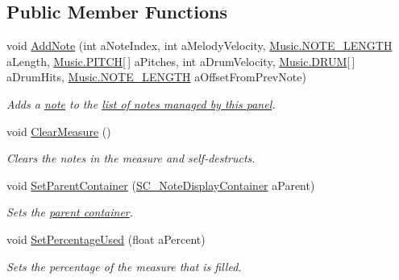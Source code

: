 \subsection*{Public Member Functions}
\begin{DoxyCompactItemize}
\item 
void \hyperlink{group___s_c___m_d_p_pub_func_gadce2fd2e70d867b38c98305e2392b3df}{Add\+Note} (int a\+Note\+Index, int a\+Melody\+Velocity, \hyperlink{group___music_enums_gaf11b5f079adbb21c800b9eca1c5c3cbd}{Music.\+N\+O\+T\+E\+\_\+\+L\+E\+N\+G\+TH} a\+Length, \hyperlink{group___music_enums_ga508f69b199ea518f935486c990edac1d}{Music.\+P\+I\+T\+CH}\mbox{[}$\,$\mbox{]} a\+Pitches, int a\+Drum\+Velocity, \hyperlink{group___music_enums_gade475b4382c7066d1af13e7c13c029b6}{Music.\+D\+R\+UM}\mbox{[}$\,$\mbox{]} a\+Drum\+Hits, \hyperlink{group___music_enums_gaf11b5f079adbb21c800b9eca1c5c3cbd}{Music.\+N\+O\+T\+E\+\_\+\+L\+E\+N\+G\+TH} a\+Offset\+From\+Prev\+Note)
\begin{DoxyCompactList}\small\item\em Adds a \hyperlink{group___music_structs_struct_music_1_1_combined_note}{note} to the \hyperlink{group___s_c___m_d_p_priv_var_gaf8a533bce87e58d8f7a1da88f476ac6f}{list of notes managed by this panel}. \end{DoxyCompactList}\item 
void \hyperlink{group___s_c___m_d_p_pub_func_ga5c4379bcb1309f70b7406eb6523c6179}{Clear\+Measure} ()
\begin{DoxyCompactList}\small\item\em Clears the notes in the measure and self-\/destructs. \end{DoxyCompactList}\item 
void \hyperlink{group___s_c___m_d_p_pub_func_ga334c177603c25d6206b7c7b639281b07}{Set\+Parent\+Container} (\hyperlink{class_s_c___note_display_container}{S\+C\+\_\+\+Note\+Display\+Container} a\+Parent)
\begin{DoxyCompactList}\small\item\em Sets the \hyperlink{group___doc_s_c___n_d_c}{parent container}. \end{DoxyCompactList}\item 
void \hyperlink{group___s_c___m_d_p_pub_func_gab8a32b1ba282d441cb1325d29f53dd1c}{Set\+Percentage\+Used} (float a\+Percent)
\begin{DoxyCompactList}\small\item\em Sets the percentage of the measure that is filled. \end{DoxyCompactList}\item 

\end{DoxyCompactItemize}
